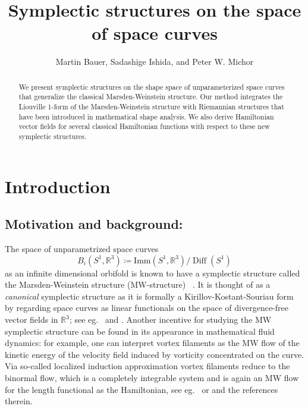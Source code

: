 \documentclass[12pt]{amsart}
\title{Symplectic structures on the space of space curves}
\author{Martin Bauer, Sadashige Ishida, and Peter W. Michor}
\newcommand{\AuthorCOMMENT}[3]{\textcolor{#2}{{[\textbf{#1:} \textsl{#3}}]}}  %
\newcommand{\cSI}[1]{\AuthorCOMMENT{Sadashige}{violet}{#1}}
\newcommand{\rev}[1]{#1}
\theoremstyle{definition}
\newcommand{\R}{\mathbb R}
\newcommand{\Diff}{\operatorname{Diff}(S^1)}
\newcommand{\Imm}{\mathrm{Imm}}
\def\L{\mathcal{L}}
\def\R{{\mathbb R}}
\begin{document}
\begin{abstract}
   We present symplectic structures on the shape space of unparameterized space curves that generalize the classical Marsden-Weinstein structure. Our method integrates the Liouville 1-form of the Marsden-Weinstein structure with Riemannian structures that have been introduced in mathematical shape analysis. We also derive Hamiltonian vector fields for several classical Hamiltonian functions with respect to these new symplectic structures. 
\end{abstract}

\maketitle



\setcounter{tocdepth}{1}
\tableofcontents
\section{Introduction}
\subsection*{Motivation and background:}
The space of unparametrized space curves $$\rev{B_i(S^1,\R^3)\coloneqq\Imm(S^1,\mathbb R^3)/\Diff}$$ as an infinite dimensional orbifold is known to have a symplectic structure called the Marsden-Weinstein structure 
 (MW-structure) ~\cite{MarsdenWeinstein1983}. It is thought of as a \emph{canonical} symplectic structure as it is formally a Kirillov-Kostant-Souriau form by regarding space curves as linear functionals on the space of divergence-free vector fields in $\R^3$;  see eg.~\cite[Theorem 4.2]{MarsdenWeinstein1983} and \cite[Chapter VI, Proposition 3.6]{ArnoldKhesin2021}. Another incentive for studying the MW symplectic structure can be found in its appearance in mathematical fluid dynamics:  for example, one can interpret vortex filaments as the MW flow of the kinetic energy of the velocity field induced by vorticity concentrated on the curve. 
 Via so-called localized induction approximation vortex filaments reduce to the binormal flow, which is a completely integrable system and is again an MW flow for the length functional as the Hamiltonian, see eg.~\cite[Chapter 11]{Saffman1993vortex} or \cite[Chapter 7]{Majda_Bertozzi2001incompressibleFlow} and the references therein.
\end{document}
